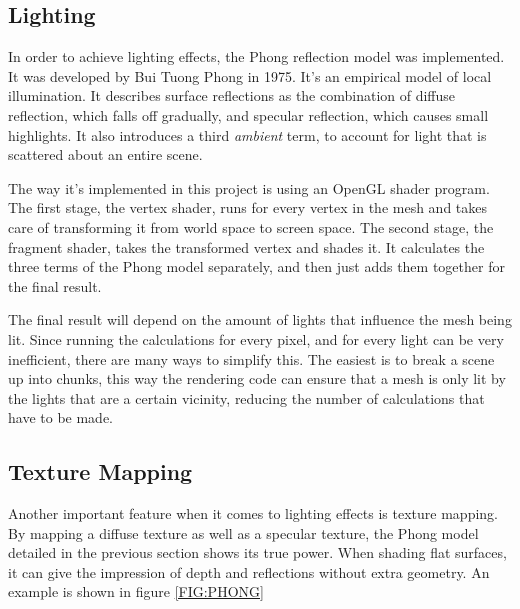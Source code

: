 
\subsection{Lighting}

In order to achieve lighting effects,
the Phong reflection model was implemented.
It was developed by Bui Tuong Phong in 1975\cite{phong}.
It's an empirical model of local illumination.
It describes surface reflections as the combination of diffuse reflection,
which falls off gradually,
and specular reflection,
which causes small highlights.
It also introduces a third \textit{ambient} term,
to account for light that is scattered about an entire scene.

The way it's implemented in this project is using an OpenGL shader program.
The first stage, the vertex shader,
runs for every vertex in the mesh and takes care of transforming it from world space to screen space.
The second stage, the fragment shader,
takes the transformed vertex and shades it.
It calculates the three terms of the Phong model separately,
and then just adds them together for the final result.

The final result will depend on the amount of lights that influence the mesh being lit.
Since running the calculations for every pixel,
and for every light can be very inefficient,
there are many ways to simplify this.
The easiest is to break a scene up into chunks,
this way the rendering code can ensure that a mesh is only lit by the lights that are a certain vicinity,
reducing the number of calculations that have to be made.

\subsection{Texture Mapping}

Another important feature when it comes to lighting effects is texture mapping.
By mapping a diffuse texture as well as a specular texture,
the Phong model detailed in the previous section shows its true power.
When shading flat surfaces,
it can give the impression of depth and reflections without extra geometry.
An example is shown in figure \ref{FIG:PHONG}

